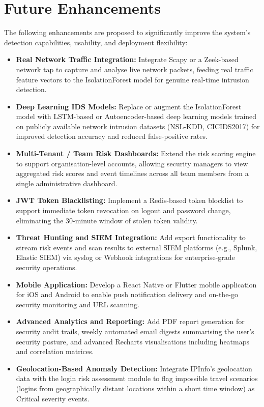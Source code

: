 \section{Future Enhancements}
The following enhancements are proposed to significantly improve the system's detection capabilities, usability, and deployment flexibility:

\begin{itemize}
    \item \textbf{Real Network Traffic Integration:} Integrate Scapy or a Zeek-based network tap to capture and analyse live network packets, feeding real traffic feature vectors to the IsolationForest model for genuine real-time intrusion detection.

    \item \textbf{Deep Learning IDS Models:} Replace or augment the IsolationForest model with LSTM-based or Autoencoder-based deep learning models trained on publicly available network intrusion datasets (NSL-KDD, CICIDS2017) for improved detection accuracy and reduced false-positive rates.

    \item \textbf{Multi-Tenant / Team Risk Dashboards:} Extend the risk scoring engine to support organisation-level accounts, allowing security managers to view aggregated risk scores and event timelines across all team members from a single administrative dashboard.

    \item \textbf{JWT Token Blacklisting:} Implement a Redis-based token blocklist to support immediate token revocation on logout and password change, eliminating the 30-minute window of stolen token validity.

    \item \textbf{Threat Hunting and SIEM Integration:} Add export functionality to stream risk events and scan results to external SIEM platforms (e.g., Splunk, Elastic SIEM) via syslog or Webhook integrations for enterprise-grade security operations.

    \item \textbf{Mobile Application:} Develop a React Native or Flutter mobile application for iOS and Android to enable push notification delivery and on-the-go security monitoring and URL scanning.

    \item \textbf{Advanced Analytics and Reporting:} Add PDF report generation for security audit trails, weekly automated email digests summarising the user's security posture, and advanced Recharts visualisations including heatmaps and correlation matrices.

    \item \textbf{Geolocation-Based Anomaly Detection:} Integrate IPInfo's geolocation data with the login risk assessment module to flag impossible travel scenarios (logins from geographically distant locations within a short time window) as Critical severity events.
\end{itemize}
